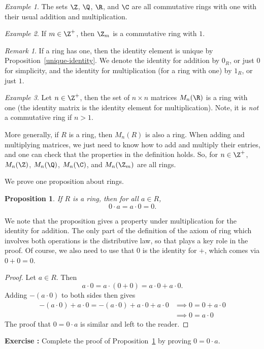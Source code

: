 \documentclass[12pt]{amsart}
\newcounter{probs}
\newenvironment{prob}{%
  \refstepcounter{probs}
  \par\medskip\noindent\textbf{Exercise \theprobs:} }{\par\medskip}
\theoremstyle{plain}
\newtheorem{prop}[thm]{Proposition}
\theoremstyle{definition}
\theoremstyle{remark}
\newtheorem*{remark}{Remark}
\newtheorem*{exam}{Example}
\begin{document}
\begin{exam}
  The sets $\Z$, $\Q$, $\R$, and $\C$ are all commutative rings with
  one with their usual addition and multiplication.
\end{exam}

\begin{exam}
  If $m\in\Z^+$, then $\Z_m$ is a commutative ring with $1$.
\end{exam}

\begin{remark}
  If a ring has one, then the identity element is unique by
  Proposition~\ref{unique-identity}.  We denote the identity for
  addition by $0_R$, or just $0$ for simplicity, and the identity for
  multiplication (for a ring with one) by $1_R$, or just $1$.
\end{remark}

\begin{exam}
  Let $n\in\Z^+$, then the set of $n\times n$ matrices $M_n(\R)$ is a
  ring with one (the identity matrix is the identity element for
  multiplication).  Note, it is \emph{not} a commutative ring if $n>1$.

  More generally, if $R$ is a ring, then $M_n(R)$ is also a ring.
  When adding and multiplying matrices, we just need to know how to
  add and multiply their entries, and one can check that the
  properties in the definition holds.  So, for $n\in\Z^+$, $M_n(\Z)$,
  $M_n(\Q)$,  $M_n(\C)$, and $M_n(\Z_m)$ are all rings.
\end{exam}
We prove one proposition about rings.
\begin{prop}\label{ring-zero}
  If $R$ is a ring, then for all $a\in R$,
  \[ 0\cdot a = a\cdot 0 = 0.\]
\end{prop}
We note that the proposition gives a property under multiplication for
the identity for addition.  The only part of the definition of the
axiom of ring which involves both operations is the distributive law,
so that plays a key role in the proof.  Of course, we also need to use
that $0$ is the identity for $+$, which comes via $0+0=0$.
\begin{proof}
  Let $a\in R$.  Then
  \[a\cdot 0 = a\cdot (0+0) = a\cdot 0+a\cdot 0.\]
  Adding $-(a\cdot 0)$ to both sides then gives
  \begin{align*}
-(a\cdot 0)+a\cdot 0=-(a\cdot 0)+a\cdot 0+a\cdot 0 &\implies
0 = 0+a\cdot 0\\
&\implies 0=a\cdot 0
\end{align*}
The proof that $0=0\cdot a$ is similar and left to the reader.
\end{proof}
\begin{prob}
  Complete the proof of Proposition~\ref{ring-zero} by proving
  $0=0\cdot a$.
\end{prob}
\end{document}

